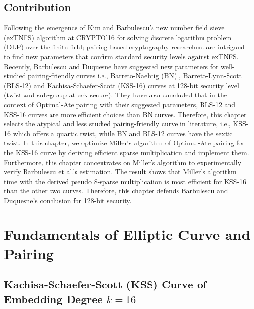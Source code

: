 \subsection{Contribution}
Following the emergence of Kim and Barbulescu's new number field sieve (exTNFS) algorithm at CRYPTO'16 \cite{C:KimBar16} for solving discrete logarithm problem (DLP) over the finite field; pairing-based cryptography researchers are intrigued to find new parameters that confirm standard security levels against exTNFS. 
Recently, Barbulescu and Duquesne have suggested new parameters \cite{EPRINT:BarDuq17} for well-studied pairing-friendly curves i.e., Barreto-Naehrig (BN) \cite{SAC:BarNae05}, Barreto-Lynn-Scott (BLS-12) \cite{SCN:BarLynSco02} and Kachisa-Schaefer-Scott (KSS-16) \cite{EPRINT:KacSchSco07} curves at 128-bit security level (twist and sub-group attack secure). 
They have also concluded that in the context of Optimal-Ate pairing with their suggested parameters, BLS-12 and KSS-16 curves are more efficient choices than BN curves. 
Therefore, this chapter selects the atypical and less studied pairing-friendly curve in literature, i.e., KSS-16 which offers a quartic twist, while BN and BLS-12 curves have the sextic twist.
In this chapter, we optimize Miller's algorithm of Optimal-Ate pairing for the KSS-16 curve by deriving efficient sparse multiplication and implement them.
Furthermore, this chapter concentrates on Miller's algorithm to experimentally verify Barbulescu et al.'s estimation.
The result shows that Miller's algorithm time with the derived pseudo 8-sparse multiplication is most efficient for KSS-16 than the other two curves.
Therefore, this chapter defends Barbulescu and Duquesne's conclusion for 128-bit security.


\section{Fundamentals of Elliptic Curve and Pairing}

\subsection{Kachisa-Schaefer-Scott (KSS) Curve of Embedding Degree \texorpdfstring{$k=16$}{k=16}}
\label{sec:ch:indo:kss16curve}

